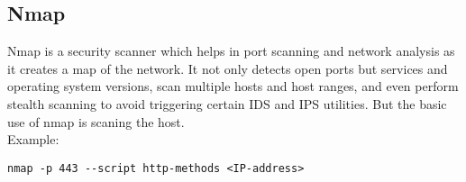 \subsection{Nmap}
Nmap is a security scanner which helps in port scanning and network analysis as it creates a map of the network. It not only detects open ports but services and operating system versions, scan multiple hosts and host ranges, and even perform stealth scanning to avoid triggering certain IDS and IPS utilities. But the basic use of nmap is scaning the host. \\
Example:
\begin{lstlisting}
nmap -p 443 --script http-methods <IP-address>
\end{lstlisting}